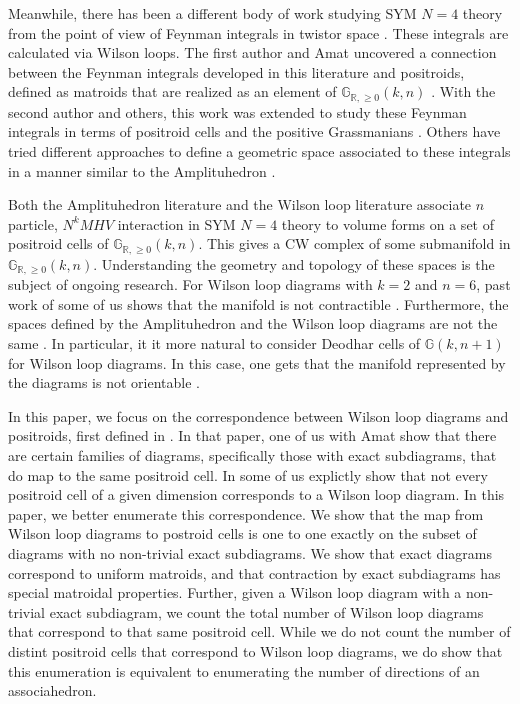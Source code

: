 \documentclass[11pt]{article}
\newcommand{\R}{\mathbb{R}}
\newcommand{\Gr}{\mathbb{G}_{\R, \geq 0}}
\theoremstyle{remark}
\theoremstyle{definition}
\begin{document}
Meanwhile, there has been a different body of work studying SYM $N=4$ theory from the point of view of Feynman integrals in twistor space \cite{Adamo:2011pv, Britto:2005fq, Cachazo:2004kj}. These integrals are calculated via Wilson loops. The first author and Amat uncovered a connection between the Feynman integrals developed in this literature and positroids, defined  as matroids that are realized as an element of $\Gr(k,n)$ \cite{wilsonloop}. With the second author and others, this work was extended to study these Feynman integrals in terms of positroid cells and the positive Grassmanians \cite{casestudy, non-orientable}. Others have tried different approaches to define a geometric space associated to these integrals in a manner similar to the Amplituhedron \cite{Amplituhedronsquared, HeslopStewart}. 

Both the Amplituhedron literature and the Wilson loop literature associate $n$ particle, $N^kMHV$ interaction in SYM $N=4$ theory to volume forms on a set of positroid cells of $\Gr(k,n)$. This gives a CW complex of some submanifold in $\Gr(k,n)$. Understanding the geometry and topology of these spaces is the subject of ongoing research. For Wilson loop diagrams with $k=2$ and $n=6$, past work of some of us shows that the manifold is not contractible \cite{casestudy}. Furthermore, the spaces defined by the Amplituhedron and the Wilson loop diagrams are not the same \cite{Amplituhedronsquared}. In particular, it it more natural to consider Deodhar cells of $\mathbb{G}(k, n+1)$ for Wilson loop diagrams. In this case, one gets that the manifold represented by the diagrams is not orientable \cite{non-orientable}. 

In this paper, we focus on the correspondence between Wilson loop diagrams and positroids, first defined in \cite{wilsonloop}. In that paper, one of us with Amat show that there are certain families of diagrams, specifically those with exact subdiagrams, that do map to the same positroid cell. In \cite{casestudy} some of us explictly show that not every positroid cell of a given dimension corresponds to a Wilson loop diagram. In this paper, we better enumerate this correspondence. We show that the map from Wilson loop diagrams to postroid cells is one to one exactly on the subset of diagrams with no non-trivial exact subdiagrams. We show that exact diagrams correspond to uniform matroids, and that contraction by exact subdiagrams has special matroidal properties. Further, given a Wilson loop diagram with a non-trivial exact subdiagram, we count the total number of Wilson loop diagrams that correspond to that same positroid cell. While we do not count the number of distint positroid cells that correspond to Wilson loop diagrams, we do show that this enumeration is equivalent to enumerating the number of directions of an associahedron.
\end{document}
